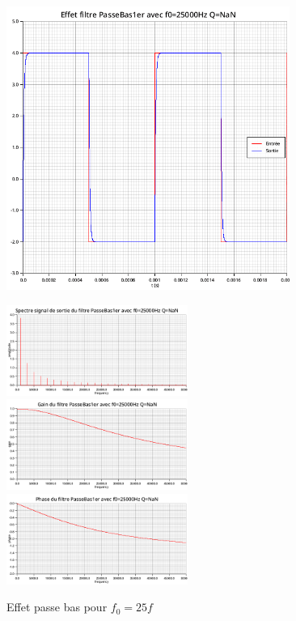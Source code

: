 \documentclass{article}
\begin{document}
\begin{figure}[H]
  \begin{minipage}{0.6\textwidth}
      \centering
      \includegraphics[width=25em]{images/creneau/bas/25/signals.png}
  \end{minipage}
  \begin{minipage}{0.3\textwidth}
      \centering
      \includegraphics[width=16em]{images/creneau/bas/25/fft_out.png}
      \vfill
      \includegraphics[width=16em]{images/creneau/bas/25/gain.png}
      \vfill
      \includegraphics[width=16em]{images/creneau/bas/25/phase.png}
  \end{minipage}
  \caption{Effet passe bas pour $f_0=25f$}
\end{figure}
\end{document}
